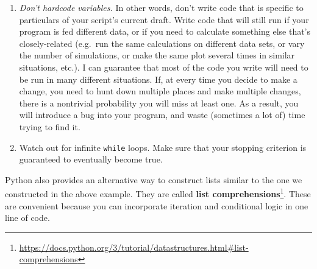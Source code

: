 \documentclass[12pt,krantz2]{krantz}
\makeatletter
\newenvironment{Shaded}{\begin{snugshade}}{\end{snugshade}}
\newcommand{\BuiltInTok}[1]{#1}
\newcommand{\CommentTok}[1]{\textcolor[rgb]{0.37,0.37,0.37}{\textit{#1}}}
\newcommand{\ControlFlowTok}[1]{\textcolor[rgb]{0.27,0.27,0.27}{\textbf{#1}}}
\newcommand{\DecValTok}[1]{\textcolor[rgb]{0.06,0.06,0.06}{#1}}
\newcommand{\KeywordTok}[1]{\textcolor[rgb]{0.27,0.27,0.27}{\textbf{#1}}}
\newcommand{\NormalTok}[1]{#1}
\newcommand{\OperatorTok}[1]{\textcolor[rgb]{0.43,0.43,0.43}{\textbf{#1}}}
\providecommand{\tightlist}{%
  \setlength{\itemsep}{0pt}\setlength{\parskip}{0pt}}
\renewcommand{\href}[2]{#2\footnote{\url{#1}}}
\newenvironment{kframe}{%
\medskip{}
\setlength{\fboxsep}{.8em}
 \def\at@end@of@kframe{}%
 \ifinner\ifhmode%
  \def\at@end@of@kframe{\end{minipage}}%
  \begin{minipage}{\columnwidth}%
 \fi\fi%
 \def\FrameCommand##1{\hskip\@totalleftmargin \hskip-\fboxsep
 \colorbox{shadecolor}{##1}\hskip-\fboxsep
     \hskip-\linewidth \hskip-\@totalleftmargin \hskip\columnwidth}%
 \MakeFramed {\advance\hsize-\width
   \@totalleftmargin\z@ \linewidth\hsize
   \@setminipage}}%
 {\par\unskip\endMakeFramed%
 \at@end@of@kframe}
\renewenvironment{Shaded}{\begin{kframe}}{\end{kframe}}
\makeatother
\begin{document}
\begin{rmd-caution}
\begin{enumerate}
  \begin{itemize}
  \tightlist
  \item
    Python starts counting from \(0\), while R starts counting from \(1\)
  \item
    sometimes iteration \texttt{i} references the \texttt{i-1}th element of a container
  \item
    The behavior of loops is sometimes more difficult to understand if they're using \href{https://cran.r-project.org/doc/manuals/r-release/R-lang.html\#Looping}{\texttt{break}} or \href{https://docs.python.org/3/tutorial/controlflow.html\#break-and-continue-statements-and-else-clauses-on-loops}{\texttt{continue}/\texttt{next} statements}.
  \end{itemize}
\item
  \emph{Don't hardcode variables.} In other words, don't write code that is specific to particulars of your script's current draft. Write code that will still run if your program is fed different data, or if you need to calculate something else that's closely-related (e.g.~run the same calculations on different data sets, or vary the number of simulations, or make the same plot several times in similar situations, etc.). I can guarantee that most of the code you write will need to be run in many different situations. If, at every time you decide to make a change, you need to hunt down multiple places and make multiple changes, there is a nontrivial probability you will miss at least one. As a result, you will introduce a bug into your program, and waste (sometimes a lot of) time trying to find it.
\item
  Watch out for infinite \texttt{while} loops. Make sure that your stopping criterion is guaranteed to eventually become true.
\end{enumerate}


\end{rmd-caution}

Python also provides an alternative way to construct lists similar to the one we constructed in the above example. They are called \href{https://docs.python.org/3/tutorial/datastructures.html\#list-comprehensions}{\textbf{list comprehensions}}. These are convenient because you can incorporate iteration and conditional logic in one line of code.

\begin{Shaded}
\end{Shaded}
\end{document}
